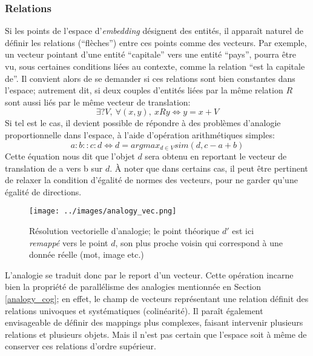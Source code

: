 \documentclass[french]{article}
\begin{document}
			\subsubsection{Relations}
				Si les points de l'espace d'\textit{embedding} désignent des entités, il apparaît naturel de définir les relations (``flèches'') entre ces points comme des vecteurs. Par exemple, un vecteur pointant d'une entité ``capitale'' vers une entité ``pays'', pourra être vu, sous certaines conditions liées au contexte, comme la relation ``est la capitale de''. Il convient alors de se demander si ces relations sont bien constantes dans l'espace; autrement dit, si deux couples d'entités liées par la même relation $R$ sont aussi liés par le même vecteur de translation:
				\begin{equation*}
				\exists?V, \ \forall (x, y), \ xRy \iff  y = x+V
				\end{equation*}
				Si tel est le cas, il devient possible de répondre à des problèmes d'analogie proportionnelle dans l'espace, à l'aide d'opération arithmétiques simples:
				\begin{equation*}
				a:b::c:d \iff d = argmax_{d\in V}sim(d, c-a+b)
				\end{equation*}
				Cette équation nous dit que l'objet $d$ sera obtenu en reportant le vecteur de translation de a vers b sur $d$. À noter que dans certains cas, il peut être pertinent de relaxer la condition d'égalité de normes des vecteurs, pour ne garder qu'une égalité de directions.
				\begin{figure}[H]
					\centering
					\texttt{[image: ../images/analogy\_vec.png]}
					\caption{Résolution vectorielle d'analogie; le point théorique $d'$ est ici \textit{remappé} vers le point $d$, son plus proche voisin qui correspond à une donnée réelle (mot, image etc.)}
				\end{figure}
				L'analogie se traduit donc par le report d'un vecteur. Cette opération incarne bien la propriété de parallélisme des analogies mentionnée en Section \ref{analogy_cog}; en effet, le champ de vecteurs représentant une relation définit des relations univoques et systématiques (colinéarité). Il paraît également envisageable de définir des mappings plus complexes, faisant intervenir plusieurs relations et plusieurs objets. Mais il n'est pas certain que l'espace soit à même de conserver ces relations d'ordre supérieur.
				
\end{document}
